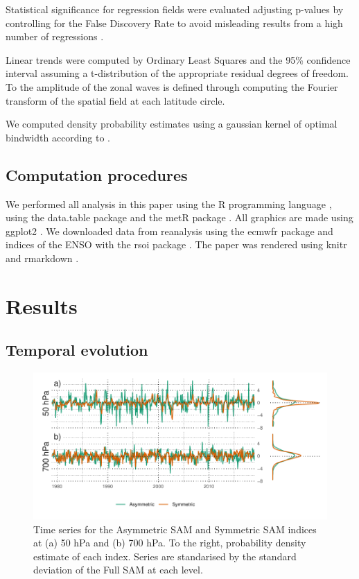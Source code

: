 \documentclass[smallextended]{svjour3}       %
\begin{document}
Statistical significance for regression fields were evaluated adjusting p-values by controlling for the False Discovery Rate \citep{benjamini1995, wilks2016} to avoid misleading results from a high number of regressions \citep{walker1914, katz1991}.

Linear trends were computed by Ordinary Least Squares and the 95\% confidence interval assuming a t-distribution of the appropriate residual degrees of freedom. To the amplitude of the zonal waves is defined through computing the Fourier transform of the spatial field at each latitude circle.

We computed density probability estimates using a gaussian kernel of optimal bindwidth according to \citet{sheather1991}.

\hypertarget{computation-procedures}{%
\subsection{Computation procedures}\label{computation-procedures}}

We performed all analysis in this paper using the R programming language \citep{rcoreteam2020}, using the data.table package \citep{dowle2020} and the metR package \citep{campitelli2020}. All graphics are made using ggplot2 \citep{wickham2009}. We downloaded data from reanalysis using the ecmwfr package \citep{hufkens2020} and indices of the ENSO with the rsoi package \citep{albers2020}. The paper was rendered using knitr and rmarkdown \citep{xie2015, allaire2019}.

\hypertarget{results}{%
\section{Results}\label{results}}

\hypertarget{temporal}{%
\subsection{Temporal evolution}\label{temporal}}

\begin{figure}
\includegraphics{asymsam-timeseries-1} \caption{Time series for the Asymmetric SAM and Symmetric SAM indices at (a) 50 hPa and (b) 700 hPa. To the right, probability density estimate of each index. Series are standarised by the standard deviation of the Full SAM at each level.}\label{fig:asymsam-timeseries}
\end{figure}
\end{document}
